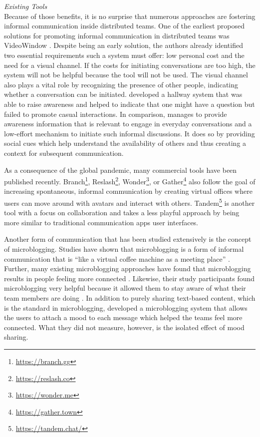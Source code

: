 \medskip\noindent\textit{Existing Tools} \\
Because of those benefits, it is no surprise that numerous approaches are fostering informal communication inside distributed teams. One of the earliest proposed solutions for promoting informal communication in distributed teams was VideoWindow \autocite{fish1990videowindow}. Despite being an early solution, the authors already identified two essential requirements such a system must offer: low personal cost and the need for a visual channel. If the costs for initiating conversations are too high, the system will not be helpful because the tool will not be used. The visual channel also plays a vital role by recognizing the presence of other people, indicating whether a conversation can be initiated. \textcite{sasaki1999video} developed a hallway system that was able to raise awareness and helped to indicate that one might have a question but failed to promote casual interactions. In comparison, \textcite{lou2012presencescape} manages to provide awareness information that is relevant to engage in everyday conversations and a low-effort mechanism to initiate such informal discussions. It does so by providing social cues which help understand the availability of others and thus creating a context for subsequent communication.

As a consequence of the global pandemic, many commercial tools have been published recently. Branch\footnote{\url{https://branch.gg}}, Reslash\footnote{\url{https://reslash.co}}, Wonder\footnote{\url{https://wonder.me}}, or Gather\footnote{\url{https://gather.town}} also follow the goal of increasing spontaneous, informal communication by creating virtual offices where users can move around with avatars and interact with others. Tandem\footnote{\url{https://tandem.chat/}} is another tool with a focus on collaboration and takes a less playful approach by being more similar to traditional communication apps user interfaces.

Another form of communication that has been studied extensively is the concept of microblogging. Studies have shown that microblogging is a form of informal communication \autocite{ehrlich2010microblogging} that is \enquote{like a virtual coffee machine as a meeting place} \autocite[p.~158]{ebner2008microblogging}. Further, many existing microblogging approaches have found that microblogging results in people feeling more connected \autocite{ehrlich2010microblogging, zhang2010case}. Likewise, their study participants found microblogging very helpful because it allowed them to stay aware of what their team members are doing \autocite{zhang2010case}. In addition to purely sharing text-based content, which is the standard in microblogging, \textcite{dullemond2013fixing} developed a microblogging system that allows the users to attach a mood to each message which helped the teams feel more connected. What they did not measure, however, is the isolated effect of mood sharing.

